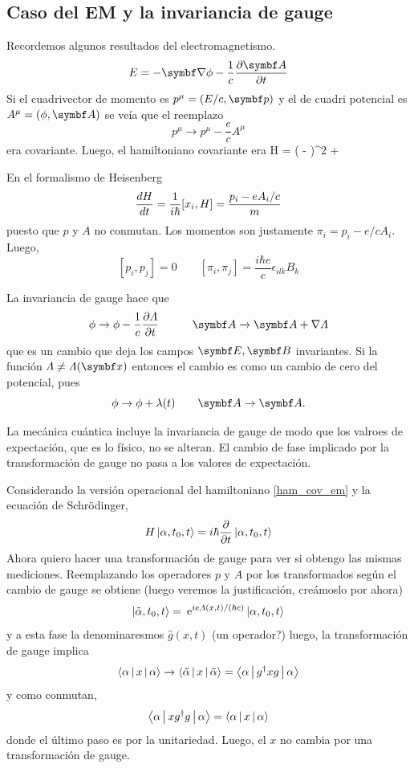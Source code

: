 \documentclass[10pt,oneside]{CBFT_book}
\begin{document}
\subsection{Caso del EM y la invariancia de gauge}

Recordemos algunos resultados del electromagnetismo.
\[
	E = - \Nabla\phi - \frac{1}{c}\dpar{\vb{A}}{t}
\]
Si el cuadrivector de momento es $p^\mu = (E/c, \vb p)$ y el de cuadri potencial es 
$A^\mu =(\phi,\vb A)$ se veía que el reemplazo
\[
	p^\mu \to p^\mu - \frac{e}{c} A^\mu
\]
era covariante.
Luego, el hamiltoniano covariante era
\be
	H =  \left(  - \right)^2 + \euler \phi 
	\label{ham_cov_em}
\ee

En el formalismo de Heisenberg
\[
	\frac{d^{\hspace{-0.05em}} {H}}{d {t}^{\hspace{-0.05em}}} = \frac{1}{i\hbar}[x_i,H] = \frac{p_i - e A_i / c}{m}
\]
puesto que $p$ y $A$ no conmutan. Los momentos son justamente $\pi_i = p_i - e/c A_i$.
Luego,
\[
	[ p_i, p_j ] = 0 \qquad 
	[ \pi_i , \pi_j ] = \frac{i\hbar e}{c} \epsilon_{i l k}B_k
\]

La invariancia de gauge hace que
\[
	\phi \to \phi - \frac{1}{c}\dpar{\Lambda}{t} \qquad \quad 
	\vb A \to \vb A + \nabla \Lambda
\]
que es un cambio que deja los campos $\vb E, \vb B$ invariantes. Si la función $\Lambda \neq \Lambda(\vb x)$
entonces el cambio es como un cambio de cero del potencial, pues 
\[
	\phi \to \phi + \lambda(t) \qquad \vb A \to \vb A.
\]

La mecánica cuántica incluye la invariancia de gauge de modo que los valroes de expectación, que es lo
físico, no se alteran.
El cambio de fase implicado por la transformación de gauge no pasa a los valores de expectación.

Considerando la versión operacional del hamiltoniano \eqref{ham_cov_em} y la ecuación de Schrödinger,
\[
	H \Ket{\alpha,t_0,t} = i \hbar \frac{\partial^{\hspace{-0.05em}} {}}{\partial {t}^{\hspace{-0.05em}}} \Ket{\alpha,t_0,t}
\]
Ahora quiero hacer una transformación de gauge para ver si obtengo las mismas mediciones.
Reemplazando los operadores $p$ y $A$ por los transformados según el cambio de gauge se obtiene
(luego veremos la justificación, creámoslo por ahora)
\[
	\Ket{\tilde{\alpha},t_0,t} = \:\mathrm{e}^{ i e \Lambda(x,t)/(\hbar c)}\Ket{\alpha,t_0,t} 
\]
y a esta fase la denominaresmos $\hat{g}(x,t)$ (un operador?) luego, la transformación de gauge implica
\[
	\Braket{\alpha|x|\alpha} \to  \Braket{\tilde{\alpha}|x|\tilde{\alpha}} = \Braket{\alpha|g^\dagger x g|\alpha}
\]
y como conmutan,
\[
	\Braket{\alpha|x g^\dagger g|\alpha} = \Braket{\alpha|x|\alpha}
\]
donde el último paso es por la unitariedad. Luego, el $x$ no cambia por una transformación de gauge.
\end{document}
